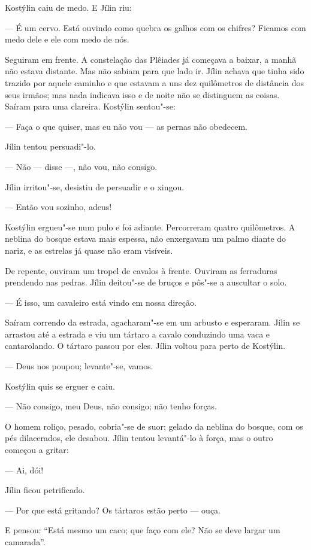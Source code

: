 Kostýlin caiu de medo. E Jílin riu:

--- É um cervo. Está ouvindo como quebra os galhos com os chifres?
Ficamos com medo dele e ele com medo de nós.

Seguiram em frente. A constelação das Plêiades já começava a baixar, a
manhã não estava distante. Mas não sabiam para que lado ir. Jílin achava
que tinha sido trazido por aquele caminho e que estavam a uns dez
quilômetros de distância dos seus irmãos; mas nada indicava isso e de
noite não se distinguem as coisas. Saíram para uma clareira. Kostýlin
sentou"-se:

--- Faça o que quiser, mas eu não vou --- as pernas não obedecem.

Jílin tentou persuadi"-lo.

--- Não --- disse ---, não vou, não consigo.

Jílin irritou"-se, desistiu de persuadir e o xingou.

--- Então vou sozinho, adeus!

Kostýlin ergueu"-se num pulo e foi adiante. Percorreram quatro
quilômetros. A neblina do bosque estava mais espessa, não enxergavam um
palmo diante do nariz, e as estrelas já quase não eram visíveis.

De repente, ouviram um tropel de cavalos à frente. Ouviram as ferraduras
prendendo nas pedras. Jílin deitou"-se de bruços e pôs"-se a auscultar o
solo.

--- É isso, um cavaleiro está vindo em nossa direção.

Saíram correndo da estrada, agacharam"-se em um arbusto e esperaram.
Jílin se arrastou até a estrada e viu um tártaro a cavalo conduzindo uma
vaca e cantarolando. O tártaro passou por eles. Jílin voltou para perto
de Kostýlin.

--- Deus nos poupou; levante"-se, vamos.

Kostýlin quis se erguer e caiu.

--- Não consigo, meu Deus, não consigo; não tenho forças.

O homem roliço, pesado, cobria"-se de suor; gelado da neblina do bosque,
com os pés dilacerados, ele desabou. Jílin tentou levantá"-lo à força,
mas o outro começou a gritar:

--- Ai, dói!

Jílin ficou petrificado.

--- Por que está gritando? Os tártaros estão perto --- ouça.

E pensou: ``Está mesmo um caco; que faço com ele? Não se deve largar um
camarada''.

